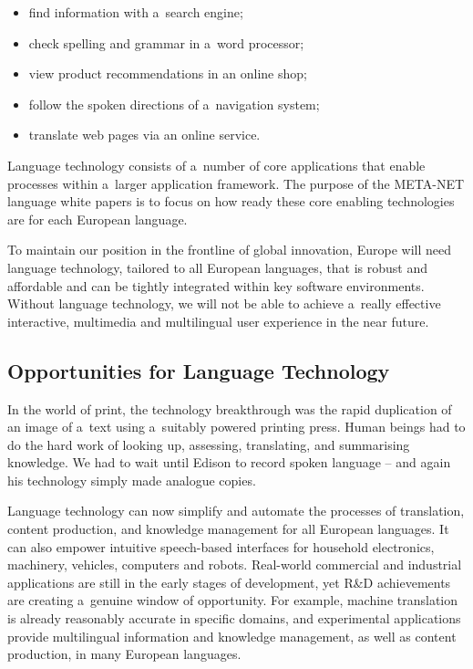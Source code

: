 \begin{multicols}{2}
\begin{itemize} \item find information with a~search engine; \item
check spelling and grammar in a~word processor; \item view product
recommendations in an online shop; \item follow the spoken directions
of a~navigation system; \item translate web pages via an online
service. \end{itemize} 

Language technology consists of a~number of core applications that
enable processes within a~larger application framework. The purpose of
the META-NET language white papers is to focus on how ready these core
enabling technologies are for each European language. 


To maintain our position in the frontline of global innovation, Europe
will need language technology, tailored to all European languages,
that is robust and affordable and can be tightly integrated within key
software environments. Without language technology, we will not be
able to achieve a~really effective interactive, multimedia and
multilingual user experience in the near future. 

\subsection{Opportunities for Language Technology} 

In the world of print, the technology breakthrough was the rapid
duplication of an image of a~text using a~suitably powered printing
press. Human beings had to do the hard work of looking up, assessing,
translating, and summarising knowledge. We had to wait until Edison to
record spoken language -- and again his technology simply made
analogue copies. 

Language technology can now simplify and automate the processes of
translation, content production, and knowledge management for all
European languages. It can also empower intuitive speech-based
interfaces for household electronics, machinery, vehicles, computers
and robots. Real-world commercial and industrial applications are
still in the early stages of development, yet R\&D achievements are
creating a~genuine window of opportunity. For example, machine
translation is already reasonably accurate in specific domains, and
experimental applications provide multilingual information and
knowledge management, as well as content production, in many European
languages. 


\end{multicols}
